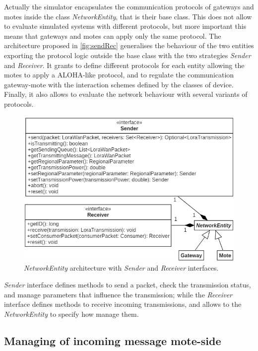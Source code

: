 Actually the simulator encapsulates the communication protocols of gateways and motes inside the class \mbox{\textit{NetworkEntity}}, that is their base class. 
This does not allow to evaluate simulated systems with different protocols, but more important this means that gateways and motes can apply only the same protocol.
The architecture proposed in \autoref{fig:sendRec} generalises the behaviour of the two entities exporting the protocol logic outside the base class with the two strategies \mbox{\textit{Sender}} and \mbox{\textit{Receiver}}. 
It grants to define different protocols for each entity allowing the motes to apply a ALOHA-like protocol, and to regulate the communication gateway-mote with the interaction schemes defined by the classes of device.
Finally, it also allows to evaluate the network behaviour with several variants of protocols.
% 
\begin{figure}[h]
    \centering
    \includegraphics{figures/sendRec.png}
    \caption{\mbox{\textit{NetworkEntity}} architecture with \mbox{\textit{Sender}} and \mbox{\textit{Receiver}} interfaces.}
    \label{fig:sendRec}
\end{figure}
 
\noindent \mbox{\textit{Sender}} interface defines methods to send a packet, check the transmission status, and manage parameters that influence the transmission; while the \mbox{\textit{Receiver}} interface defines methods to receive incoming transmissions, and allows to the \mbox{\textit{NetworkEntity}} to specify how manage them.

\subsection*{Managing of incoming message mote-side}

